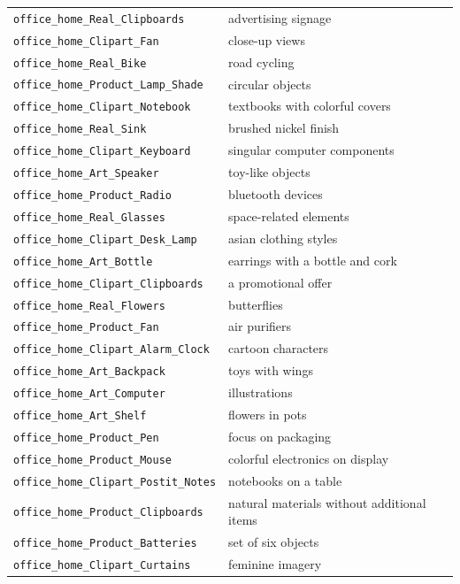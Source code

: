 \documentclass{article} %
\begin{document}
\begin{longtable}{p{} p{}}
\texttt{office\_home\_Real\_Clipboards} & advertising signage \\
\texttt{office\_home\_Clipart\_Fan} & close-up views \\
\texttt{office\_home\_Real\_Bike} & road cycling \\
\texttt{office\_home\_Product\_Lamp\_Shade} & circular objects \\
\texttt{office\_home\_Clipart\_Notebook} & textbooks with colorful covers \\
\texttt{office\_home\_Real\_Sink} & brushed nickel finish \\
\texttt{office\_home\_Clipart\_Keyboard} & singular computer components \\
\texttt{office\_home\_Art\_Speaker} & toy-like objects \\
\texttt{office\_home\_Product\_Radio} & bluetooth devices \\
\texttt{office\_home\_Real\_Glasses} & space-related elements \\
\texttt{office\_home\_Clipart\_Desk\_Lamp} & asian clothing styles \\
\texttt{office\_home\_Art\_Bottle} & earrings with a bottle and cork \\
\texttt{office\_home\_Clipart\_Clipboards} & a promotional offer \\
\texttt{office\_home\_Real\_Flowers} & butterflies \\
\texttt{office\_home\_Product\_Fan} & air purifiers \\
\texttt{office\_home\_Clipart\_Alarm\_Clock} & cartoon characters \\
\texttt{office\_home\_Art\_Backpack} & toys with wings \\
\texttt{office\_home\_Art\_Computer} & illustrations \\
\texttt{office\_home\_Art\_Shelf} & flowers in pots \\
\texttt{office\_home\_Product\_Pen} & focus on packaging \\
\texttt{office\_home\_Product\_Mouse} & colorful electronics on display \\
\texttt{office\_home\_Clipart\_Postit\_Notes} & notebooks on a table \\
\texttt{office\_home\_Product\_Clipboards} & natural materials without additional items \\
\texttt{office\_home\_Product\_Batteries} & set of six objects \\
\texttt{office\_home\_Clipart\_Curtains} & feminine imagery \\

\end{longtable}
\end{document}
